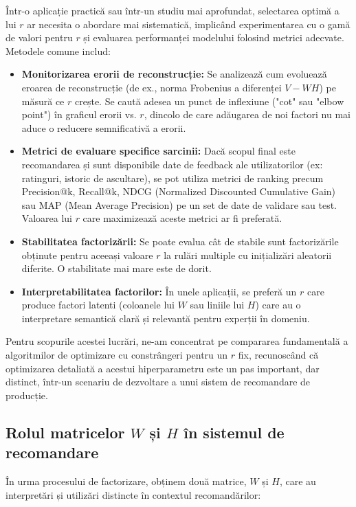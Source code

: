 \documentclass[12pt,a4paper]{article}
\begin{document}
	Într-o aplicație practică sau într-un studiu mai aprofundat, selectarea optimă a lui $r$ ar necesita o abordare mai sistematică, implicând experimentarea cu o gamă de valori pentru $r$ și evaluarea performanței modelului folosind metrici adecvate. Metodele comune includ:
	\begin{itemize}
		\item \textbf{Monitorizarea erorii de reconstrucție:} Se analizează cum evoluează eroarea de reconstrucție (de ex., norma Frobenius a diferenței $V - WH$) pe măsură ce $r$ crește. Se caută adesea un punct de inflexiune ("cot" sau "elbow point") în graficul erorii vs. $r$, dincolo de care adăugarea de noi factori nu mai aduce o reducere semnificativă a erorii.
		\item \textbf{Metrici de evaluare specifice sarcinii:} Dacă scopul final este recomandarea și sunt disponibile date de feedback ale utilizatorilor (ex: ratinguri, istoric de ascultare), se pot utiliza metrici de ranking precum Precision@k, Recall@k, NDCG (Normalized Discounted Cumulative Gain) sau MAP (Mean Average Precision) pe un set de date de validare sau test. Valoarea lui $r$ care maximizează aceste metrici ar fi preferată.
		\item \textbf{Stabilitatea factorizării:} Se poate evalua cât de stabile sunt factorizările obținute pentru aceeași valoare $r$ la rulări multiple cu inițializări aleatorii diferite. O stabilitate mai mare este de dorit.
		\item \textbf{Interpretabilitatea factorilor:} În unele aplicații, se preferă un $r$ care produce factori latenti (coloanele lui $W$ sau liniile lui $H$) care au o interpretare semantică clară și relevantă pentru experții în domeniu.
	\end{itemize}
	Pentru scopurile acestei lucrări, ne-am concentrat pe compararea fundamentală a algoritmilor de optimizare cu constrângeri pentru un $r$ fix, recunoscând că optimizarea detaliată a acestui hiperparametru este un pas important, dar distinct, într-un scenariu de dezvoltare a unui sistem de recomandare de producție.

	\subsection{Rolul matricelor $W$ și $H$ în sistemul de recomandare}
	În urma procesului de factorizare, obținem două matrice, $W$ și $H$, care au interpretări și utilizări distincte în contextul recomandărilor:
\end{document}
